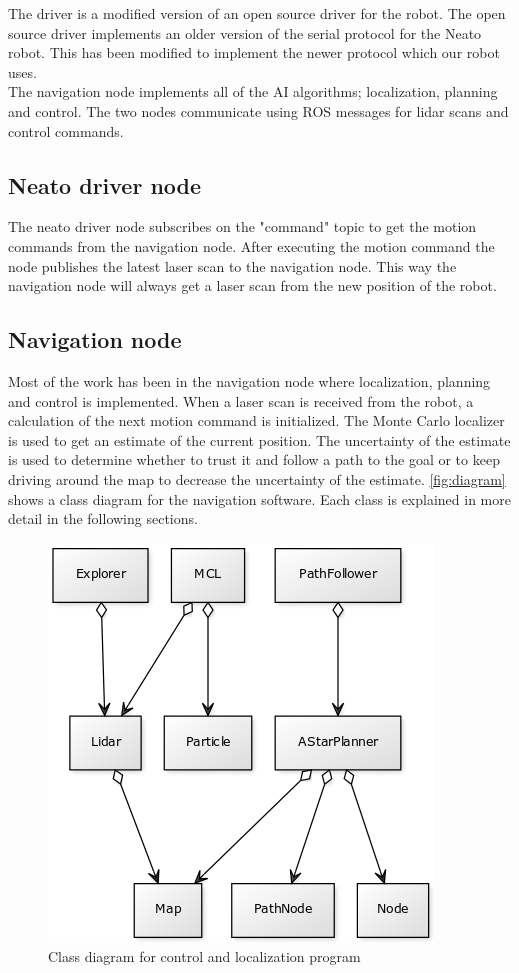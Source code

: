 The driver is a modified version of an open source driver for the robot. \cite{neato} The open source driver implements an older version of the serial protocol for the Neato robot. This has been modified to implement the newer protocol which our robot uses.\\

The navigation node implements all of the AI algorithms; localization, planning and control. The two nodes communicate using ROS messages for lidar scans and control commands. 

\subsection{Neato driver node}
The neato driver node subscribes on the "command" topic to get the motion commands from the navigation node. After executing the motion command the node publishes the latest laser scan to the navigation node. This way the navigation node will always get a laser scan from the new position of the robot.

\subsection{Navigation node}
Most of the work has been in the navigation node where localization, planning and control is implemented. When a laser scan is received from the robot, a calculation of the next motion command is initialized. The Monte Carlo localizer is used to get an estimate of the current position. The uncertainty of the estimate is used to determine whether to trust it and follow a path to the goal or to keep driving around the map to decrease the uncertainty of the estimate. \autoref{fig:diagram} shows a class diagram for the navigation software. Each class is explained in more detail in the following sections.

\begin{figure}[H]
\centering
\includegraphics[scale=0.40]{images/diagram}
\caption{Class diagram for control and localization program}
\label{fig:diagram}
\end{figure}

